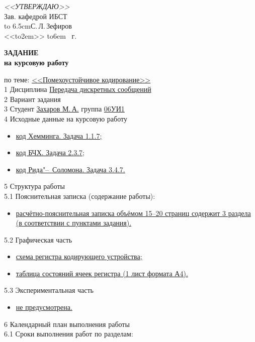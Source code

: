 \hfill\parbox{6.5cm}{
	\textit{<<УТВЕРЖДАЮ>>}\\
	Зав. кафедрой ИБСТ\\
	\hbox to 6.5cm{\hrulefill С.\,Л.\,Зефиров}\\
	\def\hrf#1{\hbox to#1{\hrulefill}}
	<<\hrf{2em}>> \hrf{6em} \the\year~г.}	
	
      \begin{center}\textbf{\normalfont\bfseries\large ЗАДАНИЕ}\\\textbf{на
        курсовую работу}\end{center}

\noindent по теме: \uline{<<Помехоустойчивое кодирование>>\hfill}\\
1 Дисциплина \uline{\qquad Передача дискретных сообщений\hfill}\\
2 Вариант задания \uline{\hfill}\\
3 Студент \uline{\qquad Захаров М.\,А.\qquad } группа \uline{\qquad 06УИ1\hfill}\\
4 Исходные данные на курсовую работу
\begin{itemize}
\item \uline{код Хемминга. Задача 1.1.7;\hfill\quad}
\item \uline{код БЧХ. Задача 2.3.7;\hfill\quad}
\item \uline{код Рида"--~Соломона. Задача 3.4.7.\hfill\quad}
\end{itemize}
5 Структура работы\\
5.1 Пояснительная записка (содержание работы):
\begin{itemize}
\item \uline{расчётно-пояснительная записка объёмом 15--20 страниц
    со\-держит 3 раздела (в соответствии с пунктами
    задания). \hfill}
\end{itemize}
5.2 Графическая часть
\begin{itemize}
\item \uline{схема регистра кодирующего устройства;\hfill\quad}
\item \uline{таблица состояний ячеек регистра (1 лист формата А4).\hfill}
\end{itemize}
5.3 Экспериментальная часть
\begin{itemize}
\item \uline{не предусмотрена.\hfill}
\end{itemize}
6 Календарный план выполнения работы\\
6.1 Сроки выполнения работ по разделам:
